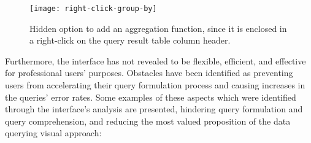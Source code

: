 \begin{figure}[htbp]
	\centering
	\texttt{[image: right-click-group-by]}
	\caption{Hidden option to add an aggregation function, since it is enclosed in a right-click on the query result table column header.}
	\label{fig:rightClickGroupBy}
\end{figure}

Furthermore, the interface has not revealed to be flexible, efficient, and effective for professional users' purposes. Obstacles have been identified as preventing users from accelerating their query formulation process and causing increases in the queries' error rates. Some examples of these aspects which were identified through the interface's analysis are presented, hindering query formulation and query comprehension, and reducing the most valued proposition of the data querying visual approach:

